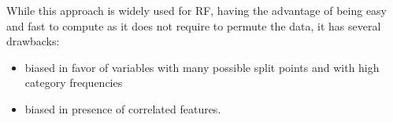While this approach is widely used for RF, having the advantage of being easy and fast to compute as it does not require to permute the data, it has several drawbacks:
\begin{itemize}
    \item biased in favor of variables with many possible split points and with high category frequencies
    \item biased in presence of correlated features.
\end{itemize}